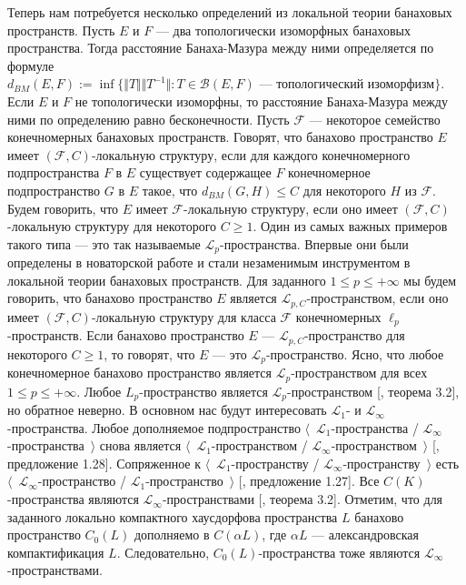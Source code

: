 Теперь нам потребуется несколько определений из локальной теории банаховых пространств. Пусть $E$ и $F$ --- два топологически изоморфных банаховых пространства. Тогда расстояние Банаха-Мазура между ними определяется по формуле $d_{BM}(E,F):=\inf\{\Vert T\Vert\Vert T^{-1}\Vert: T \in \mathcal{B}(E,F) \mbox{ --- топологический изоморфизм}\}$. Если $E$ и $F$ не топологически изоморфны, то расстояние Банаха-Мазура между ними по определению равно бесконечности. Пусть $\mathcal{F}$ --- некоторое семейство конечномерных банаховых пространств. Говорят, что банахово пространство $E$ имеет $(\mathcal{F}, C)$-локальную структуру, если для каждого конечномерного подпространства $F$ в $E$ существует содержащее $F$ конечномерное подпространство $G$ в $E$ такое, что $d_{BM}(G,H)\leq C$ для некоторого $H$ из $\mathcal{F}$. Будем говорить, что $E$ имеет $\mathcal{F}$-локальную структуру, если оно имеет $(\mathcal{F},C)$-локальную структуру для некоторого $C\geq 1$. Один из самых важных примеров такого типа --- это так называемые $\mathscr{L}_p$-пространства. Впервые они были определены в новаторской работе \cite{LinPelAbsSumOpInLpSpAndApp} и стали незаменимым инструментом в локальной теории банаховых пространств. Для заданного $1\leq p\leq +\infty$ мы будем говорить, что банахово пространство $E$ является $\mathscr{L}_{p,C}$-пространством, если оно имеет $(\mathcal{F},C)$-локальную структуру для класса $\mathcal{F}$ конечномерных $\ell_p$-пространств. Если банахово пространство $E$ --- $\mathscr{L}_{p,C}$-пространство для некоторого $C\geq 1$, то говорят, что $E$ --- это $\mathscr{L}_p$-пространство. Ясно, что любое конечномерное банахово пространство является $\mathscr{L}_p$-пространством для всех $1\leq p\leq +\infty$. Любое $L_p$-пространство является $\mathscr{L}_p$-пространством  [\cite{DiestAbsSumOps}, теорема 3.2], но обратное неверно. В основном нас будут интересовать $\mathscr{L}_1$- и $\mathscr{L}_\infty$-пространства. Любое дополняемое подпространство $\langle$~$\mathscr{L}_1$-пространства / $\mathscr{L}_\infty$-пространства~$\rangle$ снова является $\langle$~$\mathscr{L}_1$-пространством / $\mathscr{L}_\infty$-пространством~$\rangle$ [\cite{BourgNewClOfLpSp}, предложение 1.28]. Сопряженное к $\langle$~$\mathscr{L}_1$-пространству / $\mathscr{L}_\infty$-пространству~$\rangle$ есть $\langle$~$\mathscr{L}_\infty$-пространство / $\mathscr{L}_1$-пространство~$\rangle$ [\cite{BourgNewClOfLpSp}, предложение 1.27]. Все $C(K)$-пространства являются $\mathscr{L}_\infty$-пространствами [\cite{DiestAbsSumOps}, теорема 3.2]. Отметим, что для заданного локально компактного хаусдорфова пространства $L$ банахово пространство $C_0(L)$ дополняемо в $C(\alpha L)$, где $\alpha L$ --- александровская компактификация $L$. Следовательно, $C_0(L)$-пространства тоже являются $\mathscr{L}_\infty$-пространствами. 

